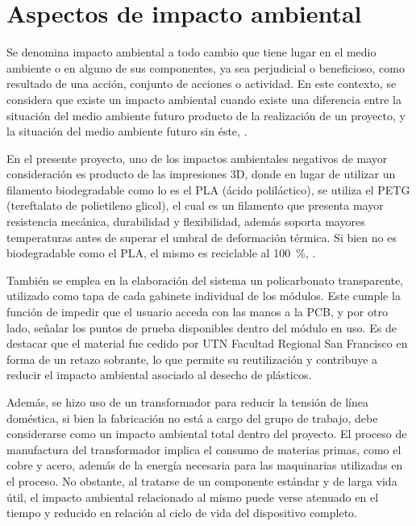 \section{Aspectos de impacto ambiental}
\justifying

Se denomina impacto ambiental a todo cambio que tiene lugar en el medio ambiente o en alguno de sus componentes, ya sea perjudicial o beneficioso, como resultado de una acción, conjunto de acciones o actividad. En este contexto, se considera que existe un impacto ambiental cuando existe una diferencia entre la situación del medio ambiente futuro producto de la realización de un proyecto, y la situación del medio ambiente futuro sin éste, \parencite{chaer2020impacto}.

En el presente proyecto, uno de los impactos ambientales negativos de mayor consideración es producto de las impresiones 3D, donde en lugar de utilizar un filamento biodegradable como lo es el PLA (ácido poliláctico), se utiliza el PETG (tereftalato de polietileno glicol), el cual es un filamento que presenta mayor resistencia mecánica, durabilidad y flexibilidad, además soporta mayores temperaturas antes de superar el umbral de deformación térmica. Si bien no es biodegradable como el PLA, el mismo es reciclable al \SI{100}{\percent}, \parencite{pla_petg}.

También se emplea en la elaboración del sistema un policarbonato transparente, utilizado como tapa de cada gabinete individual de los módulos. Este cumple la función de impedir que el usuario acceda con las manos a la PCB, y por otro lado, señalar los puntos de prueba disponibles dentro del módulo en uso. Es de destacar que el material fue cedido por UTN Facultad Regional San Francisco en forma de un retazo sobrante, lo que permite su reutilización y contribuye a reducir el impacto ambiental asociado al desecho de plásticos.

Además, se hizo uso de un transformador para reducir la tensión de línea doméstica, si bien la fabricación no está a cargo del grupo de trabajo, debe considerarse como un impacto ambiental total dentro del proyecto. El proceso de manufactura del transformador implica el consumo de materias primas, como el cobre y acero, además de la energía necesaria para las maquinarias utilizadas en el proceso. No obstante, al tratarse de un componente estándar y de larga vida útil, el impacto ambiental relacionado al mismo puede verse atenuado en el tiempo y reducido en relación al ciclo de vida del dispositivo completo.

